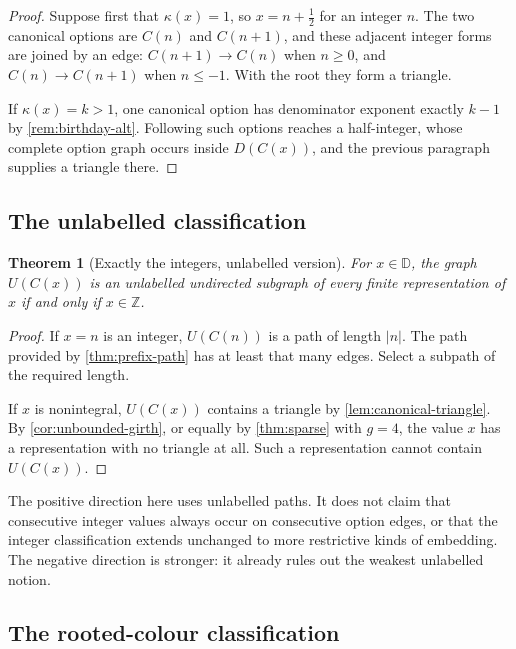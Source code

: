 \documentclass[11pt,a4paper]{article}
\numberwithin{equation}{section}
\newtheorem{theorem}{Theorem}[section]
\theoremstyle{definition}
\theoremstyle{remark}
\newcommand{\D}{\mathbb{D}}
\newcommand{\Z}{\mathbb{Z}}
\newcommand{\can}{C}
\begin{document}
\begin{proof}
Suppose first that $\kappa(x)=1$, so $x=n+\tfrac12$ for an integer $n$. The two
canonical options are $\can(n)$ and $\can(n+1)$, and these adjacent integer
forms are joined by an edge: $\can(n+1)\to\can(n)$ when $n\geq0$, and
$\can(n)\to\can(n+1)$ when $n\leq-1$. With the root they form a triangle.

If $\kappa(x)=k>1$, one canonical option has denominator exponent exactly $k-1$
by \cref{rem:birthday-alt}. Following such options reaches a half-integer, whose
complete option graph occurs inside $D(\can(x))$, and the previous paragraph
supplies a triangle there.
\end{proof}

\subsection{The unlabelled classification}

\begin{theorem}[Exactly the integers, unlabelled version]
\label{thm:integer-classification}
For $x\in\D$, the graph $U(\can(x))$ is an unlabelled undirected subgraph of
every finite representation of $x$ if and only if $x\in\Z$.
\end{theorem}

\begin{proof}
If $x=n$ is an integer, $U(\can(n))$ is a path of length $|n|$. The path
provided by \cref{thm:prefix-path} has at least that many edges. Select a
subpath of the required length.

If $x$ is nonintegral, $U(\can(x))$ contains a triangle by
\cref{lem:canonical-triangle}. By \cref{cor:unbounded-girth}, or equally by
\cref{thm:sparse} with $g=4$, the value $x$ has a representation with no triangle
at all. Such a representation cannot contain $U(\can(x))$.
\end{proof}

The positive direction here uses unlabelled paths. It does not claim that
consecutive integer values always occur on consecutive option edges, or that
the integer classification extends unchanged to more restrictive kinds of
embedding. The negative direction is stronger: it already rules out the weakest
unlabelled notion.

\subsection{The rooted-colour classification}
\end{document}
